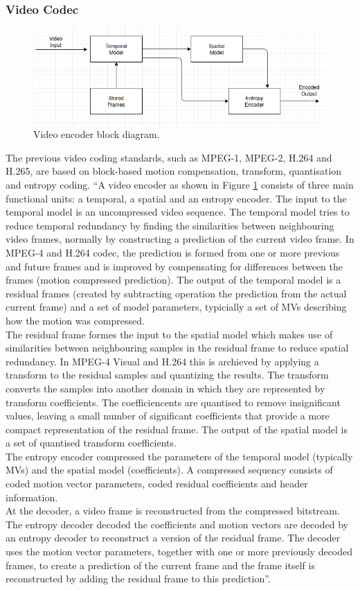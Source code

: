 \subsubsection{Video Codec}
\begin{figure}
\centering
 \includegraphics[width=0.8\linewidth]{Figures/encoder.png}
 \caption{Video encoder block diagram.}
 \label{fig:encoder}
\end{figure}
The previous video coding standards, such as MPEG-1, MPEG-2, H.264 and H.265, are based on block-based motion compensation, transform, quantisation and entropy coding. “A video encoder as shown in Figure \ref{fig:encoder} consists of three main functional units: a temporal, a spatial and an entropy encoder. The input to the temporal model is an uncompressed video sequence. The temporal model tries to reduce temporal redundancy by finding the similarities between neighbouring video frames, normally by constructing a prediction of the current video frame. In MPEG-4 and H.264 codec, the prediction is formed from one or more previous and future frames and is improved by compensating for differences between the frames (motion compressed prediction). The output of the temporal model is a residual frames (created by subtracting operation the prediction from the actual current frame) and a set of model parameters, typicially a set of MVs describing how the motion was compressed. \\
The residual frame formes the input to the spatial model which makes use of similarities between neighbouring samples in the residual frame to reduce spatial redundancy. In MPEG-4 Visual and H.264 this is archieved by applying a transform to the residual samples and quantizing the results. The transform converts the samples into another domain in which they are represented by transform coefficients. The coefficiencents are quantised to remove insignificant values, leaving a small number of significant coefficients that provide a more compact representation of the residual frame. The output of the spatial model is a set of quantised transform coefficients.\\
The entropy encoder compressed the parameters of the temporal model (typically MVs) and the spatial model (coefficients). A compressed sequency consists of coded motion vector parameters, coded residual coefficients and header information.\\
At the decoder, a video frame is reconstructed from the compressed bitstream. The entropy decoder decoded the coefficients and motion vectors are decoded by an entropy decoder to reconstruct a version of the residual frame. The decoder uses the motion vector parameters, together with one or more previously decoded frames, to create a prediction of the current frame and the frame itself is reconstructed by adding the residual frame to this prediction”.
